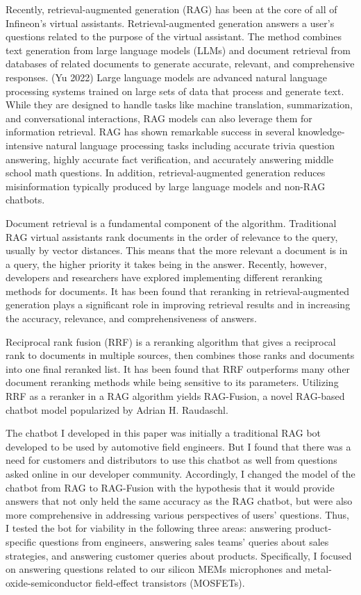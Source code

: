 \documentclass{article}
\begin{document}
Recently, retrieval-augmented generation (RAG) has been at the core of all of Infineon's virtual assistants. Retrieval-augmented generation answers a user's questions related to the purpose of the virtual assistant. The method combines text generation from large language models (LLMs) and document retrieval from databases of related documents to generate accurate, relevant, and comprehensive responses. (Yu 2022) Large language models are advanced natural language processing systems trained on large sets of data that process and generate text. While they are designed to handle tasks like machine translation, summarization, and conversational interactions, RAG models can also leverage them for information retrieval. \cite{LLMs} RAG has shown remarkable success in several knowledge-intensive natural language processing tasks including accurate trivia question answering, highly accurate fact verification, and accurately answering middle school math questions. \cite{MATH} \cite{RAGK} In addition, retrieval-augmented generation reduces misinformation typically produced by large language models and non-RAG chatbots. \cite{RAGHALL}

Document retrieval is a fundamental component of the algorithm. Traditional RAG virtual assistants rank documents in the order of relevance to the query, usually by vector distances. This means that the more relevant a document is in a query, the higher priority it takes being in the answer. Recently, however, developers and researchers have explored implementing different reranking methods for documents. It has been found that reranking in retrieval-augmented generation plays a significant role in improving retrieval results and in increasing the accuracy, relevance, and comprehensiveness of answers. \cite{RAGR}

Reciprocal rank fusion (RRF) is a reranking algorithm that gives a reciprocal rank to documents in multiple sources, then combines those ranks and documents into one final reranked list. It has been found that RRF outperforms many other document reranking methods while being sensitive to its parameters. \cite{RRO} \cite{RRA} Utilizing RRF as a reranker in a RAG algorithm yields RAG-Fusion, a novel RAG-based chatbot model popularized by Adrian H. Raudaschl. \cite{RAGF}

The chatbot I developed in this paper was initially a traditional RAG bot developed to be used by automotive field engineers. But I found that there was a need for customers and distributors to use this chatbot as well from questions asked online in our developer community. \cite{DEV} Accordingly, I changed the model of the chatbot from RAG to RAG-Fusion with the hypothesis that it would provide answers that not only held the same accuracy as the RAG chatbot, but were also more comprehensive in addressing various perspectives of users' questions. Thus, I tested the bot for viability in the following three areas: answering product-specific questions from engineers, answering sales teams' queries about sales strategies, and answering customer queries about products. Specifically, I focused on answering questions related to our silicon MEMs microphones  and metal-oxide-semiconductor field-effect transistors (MOSFETs). \cite{MEMS} \cite{MOSFETS}
\end{document}
